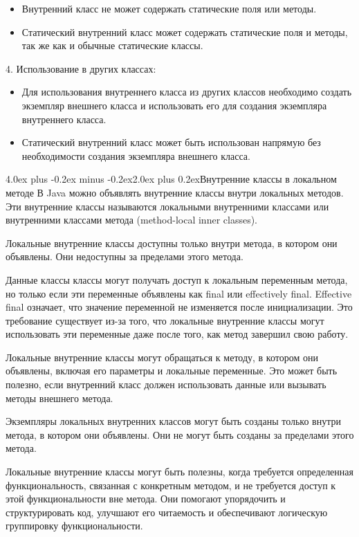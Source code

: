 \documentclass[12pt, a4paper]{book}%
\makeatletter
\renewcommand{\section}{\@startsection{section}{1}{1pt}%
{4.0ex plus -0.2ex minus -0.2ex}{2.0ex plus 0.2ex}{\centering\bf}}%
\makeatother
\begin{document}
{\begin{itemize}
  \item Внутренний класс не может содержать статические поля или методы.
   \item Статический внутренний класс может содержать статические поля и методы, так же как и обычные статические классы.
\end{itemize}

4. Использование в других классах:

\begin{itemize}
  \item Для использования внутреннего класса из других классов необходимо создать экземпляр внешнего класса и использовать его для создания экземпляра внутреннего класса.
   \item Статический внутренний класс может быть использован напрямую без необходимости создания экземпляра внешнего класса.
\end{itemize}

\section{Внутренние классы в локальном методе}
В Java можно объявлять внутренние классы внутри локальных методов. Эти внутренние классы называются локальными внутренними классами или внутренними классами метода (method-local inner classes).

Локальные внутренние классы доступны только внутри метода, в котором они объявлены. Они недоступны за пределами этого метода. 

Данные классы классы могут получать доступ к локальным переменным метода, но только если эти переменные объявлены как final или effectively final. Effective final означает, что значение переменной не изменяется после инициализации. Это требование существует из-за того, что локальные внутренние классы могут использовать эти переменные даже после того, как метод завершил свою работу.

Локальные внутренние классы могут обращаться к методу, в котором они объявлены, включая его параметры и локальные переменные. Это может быть полезно, если внутренний класс должен использовать данные или вызывать методы внешнего метода.

Экземпляры локальных внутренних классов могут быть созданы только внутри метода, в котором они объявлены. Они не могут быть созданы за пределами этого метода.

Локальные внутренние классы могут быть полезны, когда требуется определенная функциональность, связанная с конкретным методом, и не требуется доступ к этой функциональности вне метода. Они помогают упорядочить и структурировать код, улучшают его читаемость и обеспечивают логическую группировку функциональности.

}
\end{document}
